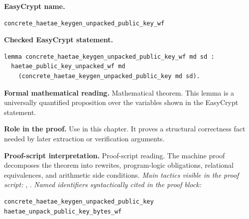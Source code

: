 \begin{formaltheorem}
\noindent\textbf{EasyCrypt name.}
\begin{lstlisting}[language=EasyCrypt,basicstyle=\ttfamily\scriptsize]
concrete_haetae_keygen_unpacked_public_key_wf
\end{lstlisting}
\noindent\textbf{Checked EasyCrypt statement.}
\begin{lstlisting}[language=EasyCrypt,basicstyle=\ttfamily\scriptsize]
lemma concrete_haetae_keygen_unpacked_public_key_wf md sd :
  haetae_public_key_unpacked_wf md
    (concrete_haetae_keygen_unpacked_public_key md sd).
\end{lstlisting}
\noindent\textbf{Formal mathematical reading.}
Mathematical theorem. This lemma is a universally quantified proposition over the variables shown in the EasyCrypt statement.

\noindent\textbf{Role in the proof.}
Use in this chapter. It proves a structural correctness fact needed by later extraction or verification arguments.

\noindent\textbf{Proof-script interpretation.}
Proof-script reading. The machine proof decomposes the theorem into rewrites, program-logic obligations, relational equivalences, and arithmetic side conditions.
\emph{Main tactics visible in the proof script:} , .
\emph{Named identifiers syntactically cited in the proof block:}
\begin{lstlisting}[language=EasyCrypt,basicstyle=\ttfamily\scriptsize]
concrete_haetae_keygen_unpacked_public_key
haetae_unpack_public_key_bytes_wf
\end{lstlisting}

\end{formaltheorem}

